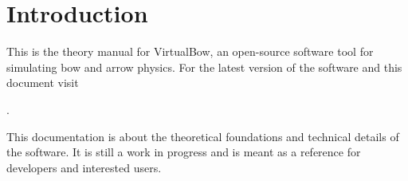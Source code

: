 \chapter{Introduction}

This is the theory manual for VirtualBow, an open-source software tool for simulating bow and arrow physics.
For the latest version of the software and this document visit

\website.

This documentation is about the theoretical foundations and technical details of the software.
It is still a work in progress and is meant as a reference for developers and interested users.